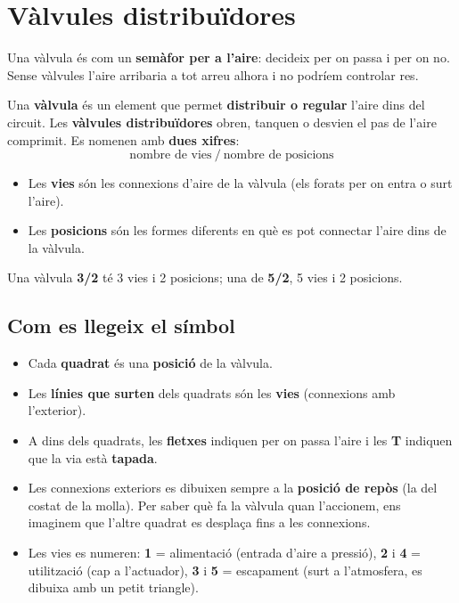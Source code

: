 \section{Vàlvules distribuïdores}

Una vàlvula és com un \textbf{semàfor per a l'aire}: decideix per on passa i per on no. Sense vàlvules l'aire arribaria a tot arreu alhora i no podríem controlar res.

\begin{idea}
Una \textbf{vàlvula} és un element que permet \textbf{distribuir o regular} l'aire dins del circuit. Les \textbf{vàlvules distribuïdores} obren, tanquen o desvien el pas de l'aire comprimit. Es nomenen amb \textbf{dues xifres}:
\[ \boxed{\ \text{nombre de vies}\ /\ \text{nombre de posicions}\ } \]
\begin{itemize}
 \item Les \textbf{vies} són les connexions d'aire de la vàlvula (els forats per on entra o surt l'aire).
 \item Les \textbf{posicions} són les formes diferents en què es pot connectar l'aire dins de la vàlvula.
\end{itemize}
Una vàlvula \textbf{3/2} té 3 vies i 2 posicions; una de \textbf{5/2}, 5 vies i 2 posicions.
\end{idea}

\subsection*{Com es llegeix el símbol}

\begin{itemize}
 \item Cada \textbf{quadrat} és una \textbf{posició} de la vàlvula.
 \item Les \textbf{línies que surten} dels quadrats són les \textbf{vies} (connexions amb l'exterior).
 \item A dins dels quadrats, les \textbf{fletxes} indiquen per on passa l'aire i les \textbf{T} indiquen que la via està \textbf{tapada}.
 \item Les connexions exteriors es dibuixen sempre a la \textbf{posició de repòs} (la del costat de la molla). Per saber què fa la vàlvula quan l'accionem, ens imaginem que l'altre quadrat es desplaça fins a les connexions.
 \item Les vies es numeren: \textbf{1} = alimentació (entrada d'aire a pressió), \textbf{2} i \textbf{4} = utilització (cap a l'actuador), \textbf{3} i \textbf{5} = escapament (surt a l'atmosfera, es dibuixa amb un petit triangle).
\end{itemize}

